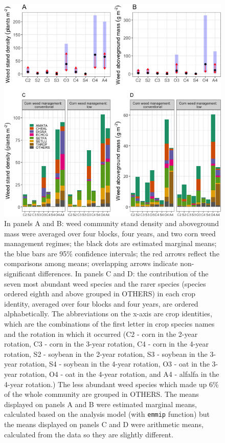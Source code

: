 \documentclass[
]{article}
\begin{document}
\begin{figure}
\centering
\includegraphics{Manuscript_whole_files/figure-latex/all-sp-dens-biom-1.png}
\caption{\label{fig:all-sp-dens-biom}In panels A and B: weed community stand density and aboveground mass were averaged over four blocks, four years, and two corn weed management regimes; the black dots are estimated marginal means; the blue bars are 95\% confidence intervals; the red arrows reflect the comparisons among means; overlapping arrows indicate non-significant differences. In panels C and D: the contribution of the seven most abundant weed species and the rarer species (species ordered eighth and above grouped in OTHERS) in each crop identity, averaged over four blocks and four years, are ordered alphabetically. The abbreviations on the x-axis are crop identities, which are the combinations of the first letter in crop species names and the rotation in which it occurred (C2 - corn in the 2-year rotation, C3 - corn in the 3-year rotation, C4 - corn in the 4-year rotation, S2 - soybean in the 2-year rotation, S3 - soybean in the 3-year rotation, S4 - soybean in the 4-year rotation, O3 - oat in the 3-year rotation, O4 - oat in the 4-year rotation, and A4 - alfalfa in the 4-year rotation.) The less abundant weed species which made up 6\% of the whole community are grouped in OTHERS. The means displayed on panels A and B were estimated marginal means, calculated based on the analysis model (with \texttt{emmip} function) but the means displayed on panels C and D were arithmetic means, calculated from the data so they are slightly different.}
\end{figure}
\end{document}
